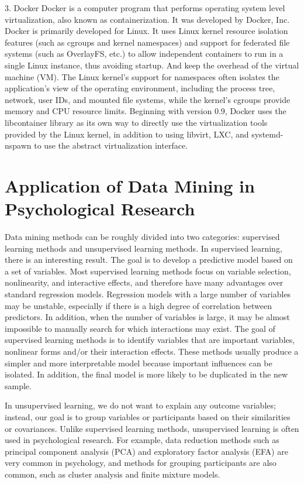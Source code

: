 3. Docker
Docker is a computer program that performs operating system level 
virtualization, also known as containerization. It was developed by
 Docker, Inc. Docker is primarily developed for Linux. It uses 
Linux kernel resource isolation features (such as cgroups and 
kernel namespaces) and support for federated file systems (such as
 OverlayFS, etc.) to allow independent containers to run in a 
single Linux instance, thus avoiding startup. And keep the overhead
 of the virtual machine (VM). The Linux kernel's support for 
namespaces often isolates the application's view of the operating 
environment, including the process tree, network, user IDs, and 
mounted file systems, while the kernel's cgroups provide memory and
 CPU resource limits. Beginning with version 0.9, Docker uses the 
libcontainer library as its own way to directly use the 
virtualization tools provided by the Linux kernel, in addition to 
using libvirt, LXC, and systemd-nspawn to use the abstract 
virtualization interface\cite{editor10}.

\section{Application of Data Mining in Psychological Research}

Data mining methods can be roughly divided into two categories: 
supervised learning methods and unsupervised learning methods. In 
supervised learning, there is an interesting result. The goal is to
 develop a predictive model based on a set of variables. Most 
supervised learning methods focus on variable selection, 
nonlinearity, and interactive effects, and therefore have many 
advantages over standard regression models. Regression models with
 a large number of variables may be unstable, especially if there 
is a high degree of correlation between predictors. In addition, 
when the number of variables is large, it may be almost impossible
 to manually search for which interactions may exist. The goal of 
supervised learning methods is to identify variables that are 
important variables, nonlinear forms and/or their interaction 
effects. These methods usually produce a simpler and more 
interpretable model because important influences can be isolated. 
In addition, the final model is more likely to be duplicated in the
 new sample\cite{editor11}.

In unsupervised learning, we do not want to explain any outcome 
variables; instead, our goal is to group variables or participants
 based on their similarities or covariances. Unlike supervised 
learning methods, unsupervised learning is often used in 
psychological research. For example, data reduction methods such as
 principal component analysis (PCA) and exploratory factor analysis
 (EFA) are very common in psychology, and methods for grouping 
participants are also common, such as cluster analysis and finite 
mixture models\cite{editor11}.

